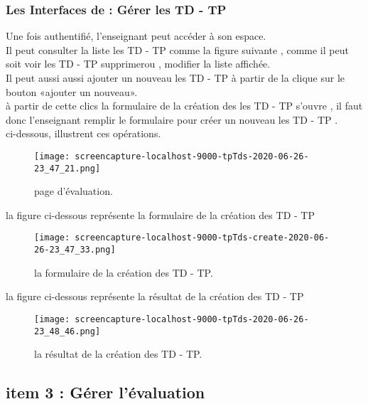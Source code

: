 \subsubsection{Les Interfaces de :  Gérer les  TD  -  TP  }
Une fois authentifié,  l'enseignant peut accéder à son espace. \\ 
Il peut consulter la liste  les  TD  -  TP comme la figure suivante
, comme il peut soit voir les  TD  -  TP  supprimerou , modifier
 la liste affichée.  \\
Il peut aussi aussi ajouter un nouveau les  TD  -  TP à partir de  la clique sur le bouton «ajouter un nouveau».  \\
à partir de cette clics la formulaire de la création des les  TD  -  TP s'ouvre , il faut donc  l'enseignant remplir le formulaire  pour créer un nouveau les  TD  -  TP . \\
ci-dessous, illustrent ces opérations.
\medskip
\medskip
\medskip
\begin{figure}[ht]
	\centering
	\texttt{[image: screencapture-localhost-9000-tpTds-2020-06-26-23\_47\_21.png]}
	\caption{page d'évaluation.}
	\label{fig:page des TD  -  TP }
\end{figure}
\FloatBarrier
\clearpage
la figure ci-dessous représente la formulaire de la création des TD  -  TP
\begin{figure}[ht]
	\centering
	\texttt{[image: screencapture-localhost-9000-tpTds-create-2020-06-26-23\_47\_33.png]}
	\caption{la formulaire de la création des TD  -  TP.}
	\label{fig:la formulaire de la création des TD  -  TP }
\end{figure}
\FloatBarrier
la figure ci-dessous représente la résultat de la création des TD  -  TP
\begin{figure}[ht]
	\centering
	\texttt{[image: screencapture-localhost-9000-tpTds-2020-06-26-23\_48\_46.png]}
	\caption{la résultat de la création des TD  -  TP.}
	\label{fig:la résultat de la création des TD  -  TP}
\end{figure}
\FloatBarrier
\clearpage
\subsection{item 3 : Gérer l'évaluation}
